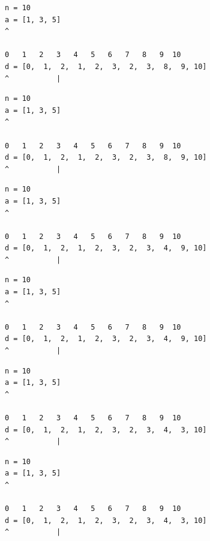 \begin{frame}[fragile]
\begin{verbatim}
n = 10
a = [1, 3, 5]
^

0   1   2   3   4   5   6   7   8   9  10
d = [0,  1,  2,  1,  2,  3,  2,  3,  8,  9, 10]
^           |
\end{verbatim}
\end{frame}
\addtocounter{framenumber}{-1}

\begin{frame}[fragile]
\begin{verbatim}
n = 10
a = [1, 3, 5]
^

0   1   2   3   4   5   6   7   8   9  10
d = [0,  1,  2,  1,  2,  3,  2,  3,  8,  9, 10]
^           |
\end{verbatim}
\end{frame}
\addtocounter{framenumber}{-1}

\begin{frame}[fragile]
\begin{verbatim}
n = 10
a = [1, 3, 5]
^

0   1   2   3   4   5   6   7   8   9  10
d = [0,  1,  2,  1,  2,  3,  2,  3,  4,  9, 10]
^           |
\end{verbatim}
\end{frame}
\addtocounter{framenumber}{-1}

\begin{frame}[fragile]
\begin{verbatim}
n = 10
a = [1, 3, 5]
^

0   1   2   3   4   5   6   7   8   9  10
d = [0,  1,  2,  1,  2,  3,  2,  3,  4,  9, 10]
^           |
\end{verbatim}
\end{frame}
\addtocounter{framenumber}{-1}

\begin{frame}[fragile]
\begin{verbatim}
n = 10
a = [1, 3, 5]
^

0   1   2   3   4   5   6   7   8   9  10
d = [0,  1,  2,  1,  2,  3,  2,  3,  4,  3, 10]
^           |
\end{verbatim}
\end{frame}
\addtocounter{framenumber}{-1}

\begin{frame}[fragile]
\begin{verbatim}
n = 10
a = [1, 3, 5]
^

0   1   2   3   4   5   6   7   8   9  10
d = [0,  1,  2,  1,  2,  3,  2,  3,  4,  3, 10]
^           |
\end{verbatim}
\end{frame}
\addtocounter{framenumber}{-1}

